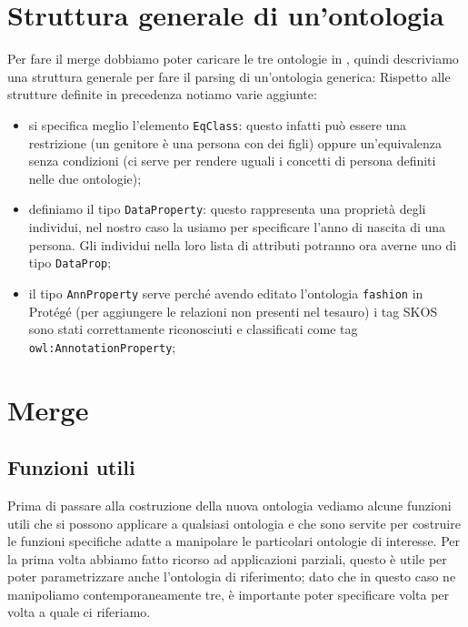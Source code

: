 \section{Struttura generale di un'ontologia}
Per fare il merge dobbiamo poter caricare le tre ontologie in \cduce, quindi descriviamo una struttura generale per fare il parsing di un'ontologia generica:
\newpage
{}
Rispetto alle strutture definite in precedenza notiamo varie aggiunte:
\begin{itemize}
	\item si specifica meglio l'elemento \verb|EqClass|: questo infatti può essere una restrizione (un genitore è una persona con dei figli) oppure un'equivalenza senza condizioni (ci serve per rendere uguali i concetti di persona definiti nelle due ontologie);
	\item definiamo il tipo \verb|DataProperty|: questo rappresenta una proprietà degli individui, nel nostro caso la usiamo per specificare l'anno di nascita di una persona. Gli individui nella loro lista di attributi potranno ora averne uno di tipo \verb|DataProp|;
	\item il tipo \verb|AnnProperty| serve perché avendo editato l'ontologia \verb|fashion| in Protégé (per aggiungere le relazioni non presenti nel tesauro) i tag SKOS sono stati correttamente riconosciuti \cite{OWL&SKOS} e classificati come tag \verb|owl:AnnotationProperty|;
\end{itemize}
\section{Merge}
\subsection{Funzioni utili}
Prima di passare alla costruzione della nuova ontologia vediamo alcune funzioni utili che si possono applicare a qualsiasi ontologia e che sono servite per costruire le funzioni specifiche adatte a manipolare le particolari ontologie di interesse.
Per la prima volta abbiamo fatto ricorso ad applicazioni parziali, questo è utile per poter parametrizzare anche l'ontologia di riferimento; dato che in questo caso ne manipoliamo contemporaneamente tre, è importante poter specificare volta per volta a quale ci riferiamo.

